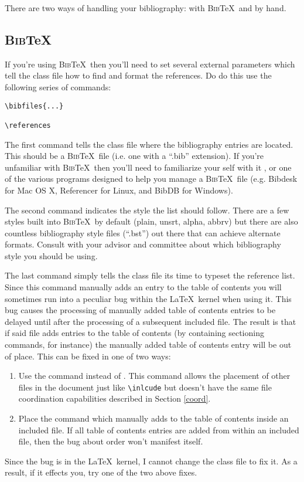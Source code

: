 There are two ways of handling your bibliography: with \textsc{Bib}\TeX\ and by hand.

\subsection{\textsc{Bib}\TeX}
If you're using \textsc{Bib}\TeX\ then you'll need to set several external parameters which tell the class file how to find and format the references.  Do do this use the following series of commands:

\begin{verbatim}
\bibfiles{...}

\references
\end{verbatim}

The first command tells the class file where the bibliography entries are located.  This should be a \textsc{Bib}\TeX\ file (i.e. one with a ``.bib'' extension).  If you're unfamiliar with \textsc{Bib}\TeX\ then you'll need to familiarize your self with it \citep{Feder:2006}, or one of the various programs designed to help you manage a \textsc{Bib}\TeX\ file (e.g. Bibdesk \citep{BibDesk} for Mac OS X, Referencer \citep{Spray:2007} for Linux, and BibDB \citep{Doron:1999} for Windows).

The second command indicates the style the list should follow.  There are a few styles built into \textsc{Bib}\TeX\ by default (plain, unsrt, alpha, abbrv) but there are also countless bibliography style files (``.bst'') out there that can achieve alternate formats.  Consult with your advisor and committee about which bibliography style you should be using.

The last command simply tells the class file its time to typeset the reference list.  Since this command manually adds an entry to the table of contents you will sometimes run into a peculiar bug within the \LaTeX\ kernel when using it.  This bug causes the processing of manually added table of contents entries to be delayed until after the processing of a subsequent included file.  The result is that if said file adds entries to the table of contents (by containing sectioning commands, for instance) the manually added table of contents entry will be out of place.  This can be fixed in one of two ways:
\begin{enumerate}
\item{Use the \verb== command instead of \verb==.  This command allows the placement of other files in the document just like \verb=\inlcude= but doesn't have the same file coordination capabilities described in Section \ref{coord}.}
\item{Place the command which manually adds to the table of contents inside an included file.  If all table of contents entries are added from within an included file, then the bug about order won't manifest itself.}
\end{enumerate}
Since the bug is in the \LaTeX\ kernel, I cannot change the class file to fix it.  As a result, if it effects you, try one of the two above fixes.

